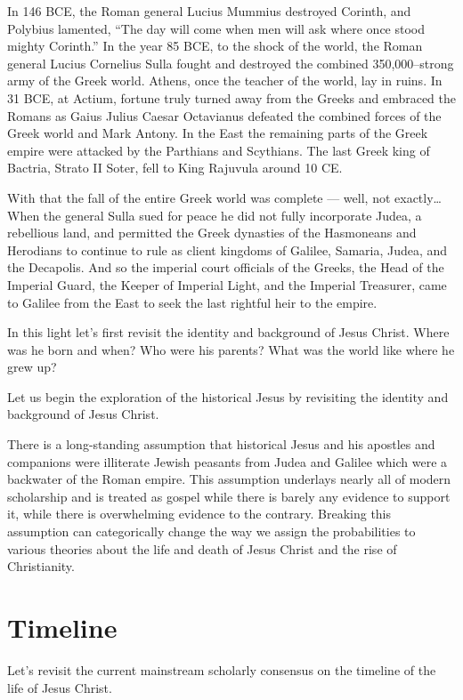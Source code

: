 In 146 BCE, the Roman general Lucius Mummius destroyed Corinth, and Polybius lamented, ``The day will come when men will ask where once stood mighty Corinth.''
In the year 85 BCE, to the shock of the world, the Roman general Lucius Cornelius Sulla fought and destroyed the combined 350,000–strong army of the Greek world.
Athens, once the teacher of the world, lay in ruins.
In 31 BCE, at Actium, fortune truly turned away from the Greeks and embraced the Romans as Gaius Julius Caesar Octavianus defeated the combined forces of the Greek world and Mark Antony.
In the East the remaining parts of the Greek empire were attacked by the Parthians and Scythians.
The last Greek king of Bactria, Strato II Soter, fell to King Rajuvula around 10 CE.

With that the fall of the entire Greek world was complete — well, not exactly\ldots{}
When the general Sulla sued for peace he did not fully incorporate Judea, a rebellious land, and permitted the Greek dynasties of the Hasmoneans and Herodians to continue to rule as client kingdoms of Galilee, Samaria, Judea, and the Decapolis.
And so the imperial court officials of the Greeks, the Head of the Imperial Guard, the Keeper of Imperial Light, and the Imperial Treasurer, came to Galilee from the East to seek the last rightful heir to the empire.

In this light let's first revisit the identity and background of Jesus Christ.
Where was he born and when?
Who were his parents?
What was the world like where he grew up?

Let us begin the exploration of the historical Jesus by revisiting the identity and background of Jesus Christ.

There is a long-standing assumption that historical Jesus and his apostles and companions were illiterate Jewish peasants from Judea and Galilee which were a backwater of the Roman empire.
This assumption underlays nearly all of modern scholarship and is treated as gospel while there is barely any evidence to support it, while there is overwhelming evidence to the contrary.
Breaking this assumption can categorically change the way we assign the probabilities to various theories about the life and death of Jesus Christ and the rise of Christianity.

\section{Timeline}\label{sec:historical-background}

Let's revisit the current mainstream scholarly consensus on the timeline of the life of Jesus Christ.

